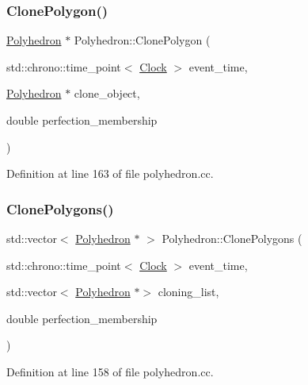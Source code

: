 \subsubsection{\texorpdfstring{Clone\+Polygon()}{ClonePolygon()}}
{\footnotesize\ttfamily \mbox{\hyperlink{class_polyhedron}{Polyhedron}} $\ast$ Polyhedron\+::\+Clone\+Polygon (\begin{DoxyParamCaption}\item[{std\+::chrono\+::time\+\_\+point$<$ \mbox{\hyperlink{universe_8h_a0ef8d951d1ca5ab3cfaf7ab4c7a6fd80}{Clock}} $>$}]{event\+\_\+time,  }\item[{\mbox{\hyperlink{class_polyhedron}{Polyhedron}} $\ast$}]{clone\+\_\+object,  }\item[{double}]{perfection\+\_\+membership }\end{DoxyParamCaption})}



Definition at line 163 of file polyhedron.\+cc.

\mbox{\label{class_polyhedron_ab4f57da9595dc92de7340cc46237a2ea}} 
\subsubsection{\texorpdfstring{Clone\+Polygons()}{ClonePolygons()}}
{\footnotesize\ttfamily std\+::vector$<$ \mbox{\hyperlink{class_polyhedron}{Polyhedron}} $\ast$ $>$ Polyhedron\+::\+Clone\+Polygons (\begin{DoxyParamCaption}\item[{std\+::chrono\+::time\+\_\+point$<$ \mbox{\hyperlink{universe_8h_a0ef8d951d1ca5ab3cfaf7ab4c7a6fd80}{Clock}} $>$}]{event\+\_\+time,  }\item[{std\+::vector$<$ \mbox{\hyperlink{class_polyhedron}{Polyhedron}} $\ast$$>$}]{cloning\+\_\+list,  }\item[{double}]{perfection\+\_\+membership }\end{DoxyParamCaption})}



Definition at line 158 of file polyhedron.\+cc.

\mbox{\label{class_polyhedron_ae5852dd26065d9f38ed293f8d95106ad}} 
